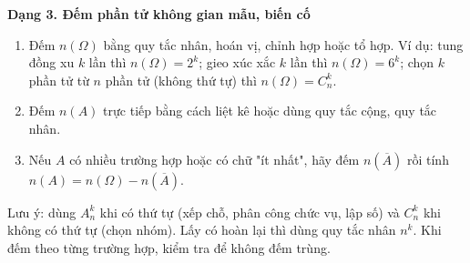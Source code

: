 \textbf{Dạng 3. Đếm phần tử không gian mẫu, biến cố}
\begin{enumerate}
\item Đếm $n(\Omega)$ bằng quy tắc nhân, hoán vị, chỉnh hợp hoặc tổ hợp. Ví dụ: tung đồng xu $k$ lần thì $n(\Omega)=2^k$; gieo xúc xắc $k$ lần thì $n(\Omega)=6^k$; chọn $k$ phần tử từ $n$ phần tử (không thứ tự) thì $n(\Omega)=C_n^k$.
\item Đếm $n(A)$ trực tiếp bằng cách liệt kê hoặc dùng quy tắc cộng, quy tắc nhân.
\item Nếu $A$ có nhiều trường hợp hoặc có chữ "ít nhất", hãy đếm $n\left(\overline{A}\right)$ rồi tính $n(A)=n(\Omega)-n\left(\overline{A}\right)$.
\end{enumerate}
Lưu ý: dùng $A_n^k$ khi có thứ tự (xếp chỗ, phân công chức vụ, lập số) và $C_n^k$ khi không có thứ tự (chọn nhóm). Lấy có hoàn lại thì dùng quy tắc nhân $n^k$. Khi đếm theo từng trường hợp, kiểm tra để không đếm trùng.
